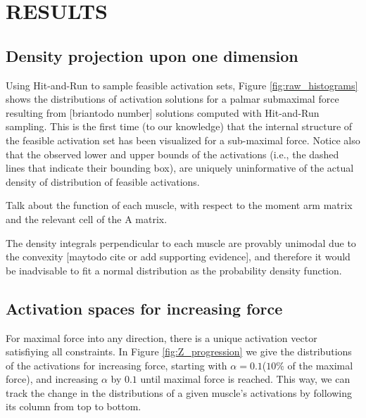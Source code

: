 

\section{RESULTS}
\subsection{Density projection upon one dimension} %
\label{ssub:density_projection_upon_one_dimension}


Using Hit-and-Run to sample feasible activation sets, Figure \ref{fig:raw_histograms} shows the distributions of activation solutions for a palmar submaximal force resulting from [briantodo number] solutions computed with Hit-and-Run sampling. This is the first time (to our knowledge) that the internal structure of the feasible activation set has been visualized for a sub-maximal force.
Notice also that the observed lower and upper bounds of the activations (i.e., the dashed lines that indicate their bounding box), are uniquely uninformative of the actual density of distribution of feasible activations.

Talk about the function of each muscle, with respect to the moment arm matrix and the relevant cell of the A matrix.

The density integrals perpendicular to each muscle are provably unimodal due to the convexity [maytodo cite or add supporting evidence], and therefore it would be inadvisable to fit a normal distribution as the probability density function.

\subsection{Activation spaces for increasing force} %
\label{sub:activation_spaces_for_increasing_force}
For maximal force into any direction, there is a unique activation vector satisfiying all constraints.
In Figure \ref{fig:Z_progression} we give the distributions of the activations for increasing force, starting with $\alpha=0.1$($10\%$ of the maximal force), and increasing $\alpha$ by $0.1$ until maximal force is reached.
This way, we can track the change in the distributions of a given muscle's activations by following its column from top to bottom.

